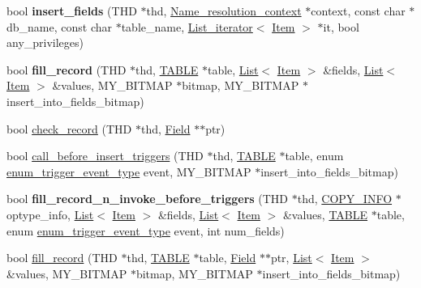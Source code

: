\begin{DoxyCompactItemize}
bool {\bfseries insert\+\_\+fields} (T\+HD $\ast$thd, \mbox{\hyperlink{structName__resolution__context}{Name\+\_\+resolution\+\_\+context}} $\ast$context, const char $\ast$db\+\_\+name, const char $\ast$table\+\_\+name, \mbox{\hyperlink{classList__iterator}{List\+\_\+iterator}}$<$ \mbox{\hyperlink{classItem}{Item}} $>$ $\ast$it, bool any\+\_\+privileges)
\item 
\mbox{\label{group__Data__Dictionary_ga6b0cee97465e5202815693c02ded951b}} 
bool {\bfseries fill\+\_\+record} (T\+HD $\ast$thd, \mbox{\hyperlink{structTABLE}{T\+A\+B\+LE}} $\ast$table, \mbox{\hyperlink{classList}{List}}$<$ \mbox{\hyperlink{classItem}{Item}} $>$ \&fields, \mbox{\hyperlink{classList}{List}}$<$ \mbox{\hyperlink{classItem}{Item}} $>$ \&values, M\+Y\+\_\+\+B\+I\+T\+M\+AP $\ast$bitmap, M\+Y\+\_\+\+B\+I\+T\+M\+AP $\ast$insert\+\_\+into\+\_\+fields\+\_\+bitmap)
\item 
bool \mbox{\hyperlink{group__Data__Dictionary_ga46a03ad3f42501f08c42bc3ab9b5eb51}{check\+\_\+record}} (T\+HD $\ast$thd, \mbox{\hyperlink{classField}{Field}} $\ast$$\ast$ptr)
\item 
bool \mbox{\hyperlink{group__Data__Dictionary_ga1f73b6e4ed87676502d07bd58eba7590}{call\+\_\+before\+\_\+insert\+\_\+triggers}} (T\+HD $\ast$thd, \mbox{\hyperlink{structTABLE}{T\+A\+B\+LE}} $\ast$table, enum \mbox{\hyperlink{trigger__def_8h_a25c92abc3a183d6950b0d9a4ee846e5e}{enum\+\_\+trigger\+\_\+event\+\_\+type}} event, M\+Y\+\_\+\+B\+I\+T\+M\+AP $\ast$insert\+\_\+into\+\_\+fields\+\_\+bitmap)
\item 
\mbox{\label{group__Data__Dictionary_ga696dd055ce9b953fc7e8d76da097f41d}} 
bool {\bfseries fill\+\_\+record\+\_\+n\+\_\+invoke\+\_\+before\+\_\+triggers} (T\+HD $\ast$thd, \mbox{\hyperlink{classCOPY__INFO}{C\+O\+P\+Y\+\_\+\+I\+N\+FO}} $\ast$optype\+\_\+info, \mbox{\hyperlink{classList}{List}}$<$ \mbox{\hyperlink{classItem}{Item}} $>$ \&fields, \mbox{\hyperlink{classList}{List}}$<$ \mbox{\hyperlink{classItem}{Item}} $>$ \&values, \mbox{\hyperlink{structTABLE}{T\+A\+B\+LE}} $\ast$table, enum \mbox{\hyperlink{trigger__def_8h_a25c92abc3a183d6950b0d9a4ee846e5e}{enum\+\_\+trigger\+\_\+event\+\_\+type}} event, int num\+\_\+fields)
\item 
bool \mbox{\hyperlink{group__Data__Dictionary_gae1dd92205f9823aac391eb8889dea9d4}{fill\+\_\+record}} (T\+HD $\ast$thd, \mbox{\hyperlink{structTABLE}{T\+A\+B\+LE}} $\ast$table, \mbox{\hyperlink{classField}{Field}} $\ast$$\ast$ptr, \mbox{\hyperlink{classList}{List}}$<$ \mbox{\hyperlink{classItem}{Item}} $>$ \&values, M\+Y\+\_\+\+B\+I\+T\+M\+AP $\ast$bitmap, M\+Y\+\_\+\+B\+I\+T\+M\+AP $\ast$insert\+\_\+into\+\_\+fields\+\_\+bitmap)

\end{DoxyCompactItemize}
